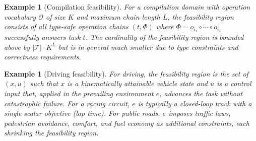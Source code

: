 \documentclass[twocolumn,11pt,a4paper]{article}
\newtheorem{example}[theorem]{Example}
\newcommand{\cT}{\mathcal{T}}
\newcommand{\cO}{\mathcal{O}}
\begin{document}
\begin{example}[Compilation feasibility]
\label{ex:compilation-feasibility}
For a compilation domain with operation vocabulary $\cO$ of size $K$ and maximum chain length $L$, the feasibility region consists of all type-safe operation chains $(t, \Phi)$ where $\Phi = o_{i_1} \circ \cdots \circ o_{i_L}$ successfully answers task $t$. The cardinality of the feasibility region is bounded above by $|\cT| \cdot K^L$ but is in general much smaller due to type constraints and correctness requirements.
\end{example}

\begin{example}[Driving feasibility]
\label{ex:driving-feasibility}
For driving, the feasibility region is the set of $(x, u)$ such that $x$ is a kinematically attainable vehicle state and $u$ is a control input that, applied in the prevailing environment $e$, advances the task without catastrophic failure. For a racing circuit, $e$ is typically a closed-loop track with a single scalar objective (lap time). For public roads, $e$ imposes traffic laws, pedestrian avoidance, comfort, and fuel economy as additional constraints, each shrinking the feasibility region.
\end{example}
\end{document}
